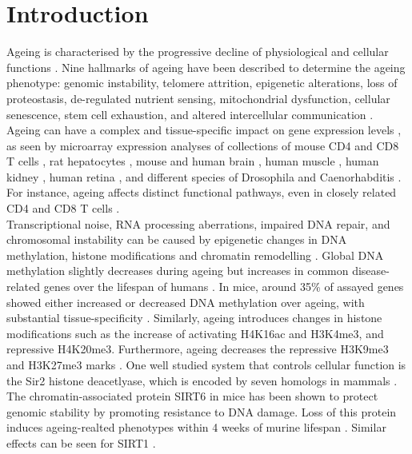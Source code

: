 
\section{Introduction}

Ageing is characterised by the progressive decline of physiological and cellular functions \citep{Lopez-Otin2013, Booth2016}. 
Nine hallmarks of ageing have been described to determine the ageing phenotype: genomic instability, telomere attrition, epigenetic alterations, loss of proteostasis, de-regulated nutrient sensing, mitochondrial dysfunction, cellular senescence, stem cell exhaustion, and altered intercellular communication \citep{Lopez-Otin2013}. 
Ageing can have a complex and tissue-specific impact on gene expression levels \citep{Zahn2007}, as seen by microarray expression analyses of collections of mouse CD4\plus{} and CD8\plus{} T cells \citep{Mirza2011}, rat hepatocytes \citep{Tollet-Egnell2000}, mouse and human brain \citep{Lu2004, Lee2000}, human muscle \citep{Welle2003, Zahn2006}, human kidney \citep{Rodwell2004}, human retina \citep{Yoshida2002}, and different species of Drosophila and Caenorhabditis \citep{Mccarroll2004}. For instance, ageing affects distinct functional pathways, even in closely related CD4\plus{} and CD8\plus{} T cells \citep{Mirza2011}. \\

Transcriptional noise, RNA processing aberrations, impaired DNA repair, and chromosomal instability can be caused by epigenetic changes in DNA methylation, histone modifications and chromatin remodelling \citep{Lopez-Otin2013}. 
Global DNA methylation slightly decreases during ageing but increases in common disease-related genes over the lifespan of humans \citep{Talens2012}. 
In mice, around 35\% of assayed genes showed either increased or decreased DNA methylation over ageing, with substantial tissue-specificity \citep{Maegawa2010}. 
Similarly, ageing introduces changes in histone modifications such as the increase of activating \gls{H4K16ac} and \gls{H3K4me3}, and repressive \gls{H4K20me3}. 
Furthermore, ageing decreases the repressive \gls{H3K9me3} and \gls{H3K27me3} marks \citep{Han2012, Fraga2007}. 
One well studied system that controls cellular function is the \gls{Sir}2 histone deacetlyase, which is encoded by seven homologs in mammals \citep{Houtkooper2016}. 
The chromatin-associated protein SIRT6 in mice has been shown to protect genomic stability by promoting resistance to DNA damage. 
Loss of this protein induces ageing-realted phenotypes within 4 weeks of murine lifespan \cite{Mostoslavsky2006}. 
Similar effects can be seen for SIRT1 \cite{Oberdoerffer2008}.\\

